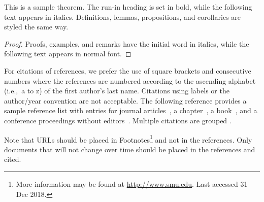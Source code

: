 \documentclass{llncs}
\begin{document}
\begin{theorem}
This is a sample theorem. The run-in heading is set in bold, while
the following text appears in italics. Definitions, lemmas,
propositions, and corollaries are styled the same way.
\end{theorem}
%
%
\begin{proof}
Proofs, examples, and remarks have the initial word in italics,
while the following text appears in normal font.
\end{proof}

For citations of references, we prefer the use of square brackets
and consecutive numbers where the references are numbered according to the ascending alphabet (i.e.,~a to z) of the first author's last name. Citations using labels or the author/year convention are not acceptable. The following reference provides
a sample reference list with entries for journal
articles~\cite{article1,article2}, a chapter~\cite{inbook}, a
book~\cite{book}, and a conference proceedings without editors~\cite{conference}.
 Multiple citations are grouped
\cite{article1,article2,inbook,book,conference}.

Note that URLs should be placed in Footnotes\footnote{More information may be found at \url{http://www.smu.edu}. Last accessed 31 Dec 2018.} and not in the references.  Only documents that will not change over time should be placed in the references and cited.
%
%
%
 
 

\end{document}
